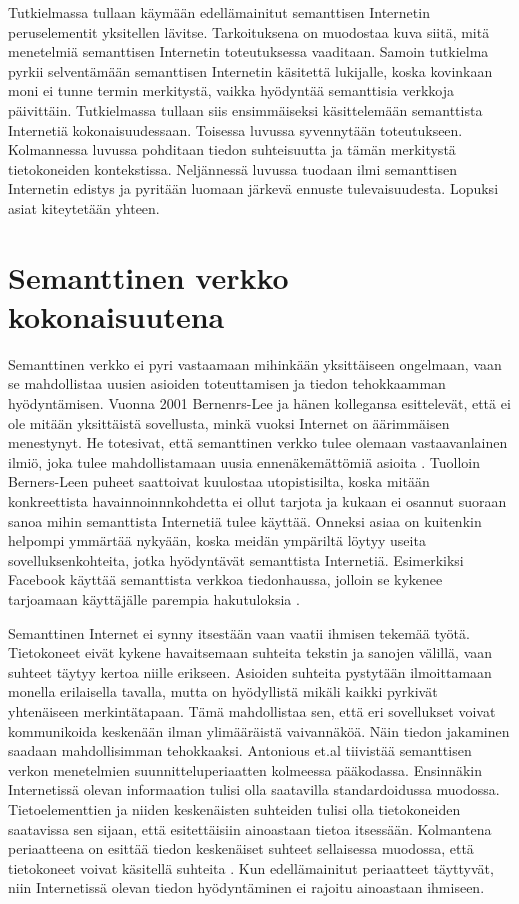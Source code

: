 \documentclass[finnish, 12pt, a4paper, elec, utf8, pdfa, online]{aaltothesis}
\begin{document}
Tutkielmassa tullaan käymään edellämainitut semanttisen Internetin peruselementit yksitellen lävitse. Tarkoituksena on muodostaa kuva siitä, mitä menetelmiä semanttisen Internetin toteutuksessa vaaditaan. Samoin tutkielma pyrkii selventämään semanttisen Internetin käsitettä lukijalle, koska kovinkaan moni ei tunne termin merkitystä, vaikka hyödyntää semanttisia verkkoja päivittäin. Tutkielmassa tullaan siis ensimmäiseksi käsittelemään semanttista Internetiä kokonaisuudessaan. Toisessa luvussa syvennytään toteutukseen. Kolmannessa luvussa pohditaan tiedon suhteisuutta ja tämän merkitystä tietokoneiden kontekstissa. Neljännessä luvussa tuodaan ilmi semanttisen Internetin edistys ja pyritään luomaan järkevä ennuste tulevaisuudesta. Lopuksi asiat kiteytetään yhteen.


\clearpage %
\section{Semanttinen verkko kokonaisuutena}


Semanttinen verkko ei pyri vastaamaan mihinkään yksittäiseen ongelmaan, vaan se mahdollistaa uusien asioiden toteuttamisen ja tiedon tehokkaamman hyödyntämisen.
Vuonna 2001 Bernenrs-Lee ja hänen kollegansa esittelevät, että ei ole mitään yksittäistä sovellusta, minkä vuoksi Internet on äärimmäisen menestynyt. He totesivat, että semanttinen verkko tulee olemaan vastaavanlainen ilmiö, joka tulee mahdollistamaan uusia ennenäkemättömiä asioita \cite{Berners_visio}. Tuolloin Berners-Leen puheet saattoivat kuulostaa utopistisilta, koska mitään konkreettista havainnoinnnkohdetta ei ollut tarjota ja kukaan ei osannut suoraan sanoa mihin semanttista Internetiä tulee käyttää. Onneksi asiaa on kuitenkin helpompi ymmärtää nykyään, koska meidän ympäriltä löytyy useita sovelluksenkohteita, jotka hyödyntävät semanttista Internetiä. Esimerkiksi Facebook käyttää semanttista verkkoa tiedonhaussa, jolloin se kykenee tarjoamaan käyttäjälle parempia hakutuloksia \cite{Facebook}.


Semanttinen Internet ei synny itsestään vaan vaatii ihmisen tekemää työtä. Tietokoneet eivät kykene havaitsemaan suhteita tekstin ja sanojen välillä, vaan suhteet täytyy kertoa niille erikseen. Asioiden suhteita pystytään ilmoittamaan monella erilaisella tavalla, mutta on hyödyllistä mikäli kaikki pyrkivät yhtenäiseen merkintätapaan. Tämä mahdollistaa sen, että eri sovellukset voivat kommunikoida keskenään ilman ylimääräistä vaivannäköä. Näin tiedon jakaminen saadaan mahdollisimman tehokkaaksi. Antonious et.al tiivistää semanttisen verkon menetelmien suunnitteluperiaatten kolmeessa pääkodassa. Ensinnäkin Internetissä olevan informaation tulisi olla saatavilla standardoidussa muodossa. Tietoelementtien ja niiden keskenäisten suhteiden tulisi olla tietokoneiden saatavissa sen sijaan, että esitettäisiin ainoastaan tietoa itsessään. Kolmantena periaatteena on esittää tiedon keskenäiset suhteet sellaisessa muodossa, että tietokoneet voivat käsitellä suhteita \cite{Antoniou}. Kun edellämainitut periaatteet täyttyvät, niin Internetissä olevan tiedon hyödyntäminen ei rajoitu ainoastaan ihmiseen.
\end{document}
